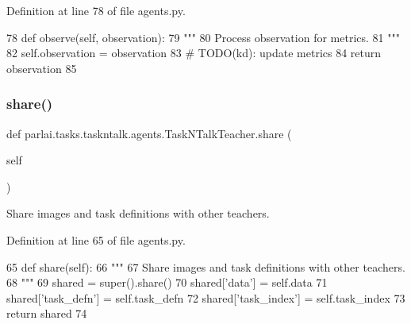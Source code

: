 Definition at line 78 of file agents.\+py.


\begin{DoxyCode}
78     \textcolor{keyword}{def }observe(self, observation):
79         \textcolor{stringliteral}{"""}
80 \textcolor{stringliteral}{        Process observation for metrics.}
81 \textcolor{stringliteral}{        """}
82         self.observation = observation
83         \textcolor{comment}{# TODO(kd): update metrics}
84         \textcolor{keywordflow}{return} observation
85 
\end{DoxyCode}
\mbox{\label{classparlai_1_1tasks_1_1taskntalk_1_1agents_1_1TaskNTalkTeacher_aab9351c1b025ee7376cc29e275d38edf}} 
\subsubsection{\texorpdfstring{share()}{share()}}
{\footnotesize\ttfamily def parlai.\+tasks.\+taskntalk.\+agents.\+Task\+N\+Talk\+Teacher.\+share (\begin{DoxyParamCaption}\item[{}]{self }\end{DoxyParamCaption})}

\begin{DoxyVerb}Share images and task definitions with other teachers.
\end{DoxyVerb}
 

Definition at line 65 of file agents.\+py.


\begin{DoxyCode}
65     \textcolor{keyword}{def }share(self):
66         \textcolor{stringliteral}{"""}
67 \textcolor{stringliteral}{        Share images and task definitions with other teachers.}
68 \textcolor{stringliteral}{        """}
69         shared = super().share()
70         shared[\textcolor{stringliteral}{'data'}] = self.data
71         shared[\textcolor{stringliteral}{'task\_defn'}] = self.task\_defn
72         shared[\textcolor{stringliteral}{'task\_index'}] = self.task\_index
73         \textcolor{keywordflow}{return} shared
74 
\end{DoxyCode}


